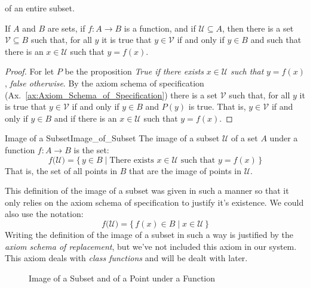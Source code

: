         of an entire subset.
        \begin{theorem}
            If $A$ and $B$ are sets, if $f:A\rightarrow{B}$ is a function,
            and if $\mathcal{U}\subseteq{A}$, then there is a set
            $\mathcal{V}\subseteq{B}$ such that, for all $y$ it is true that
            $y\in\mathcal{V}$ if and only if $y\in{B}$ and such that there is
            an $x\in\mathcal{U}$ such that $y=f(x)$.
        \end{theorem}
        \begin{proof}
            For let $P$ be the proposition \textit{True if there exists}
            $x\in\mathcal{U}$ \textit{such that} $y=f(x)$,
            \textit{false otherwise}. By the axiom schema of specification
            (Ax.~\ref{ax:Axiom_Schema_of_Specification}) there is a set
            $\mathcal{V}$ such that, for all $y$ it is true that
            $y\in\mathcal{V}$ if and only if $y\in{B}$ and $P(y)$ is true. That
            is, $y\in\mathcal{V}$ if and only if $y\in{B}$ and if there is an
            $x\in\mathcal{U}$ such that $y=f(x)$.
        \end{proof}
        \begin{fdefinition}{Image of a Subset}{Image_of_Subset}
            The image of a subset $\mathcal{U}$ of a set $A$ under a function
            $f:A\rightarrow{B}$ is the set:
            \begin{equation}
                f\big(\mathcal{U}\big)=
                    \{\,y\in{B}\;|\;\textrm{There exists }x\in\mathcal{U}
                                    \textrm{ such that }y=f(x)\,\}
            \end{equation}
            That is, the set of all points in $B$ that are the
            image of points in $\mathcal{U}$.
        \end{fdefinition}
        This definition of the image of a subset was given in such a manner
        so that it only relies on the axiom schema of specification to
        justify it's existence. We could also use the notation:
        \begin{equation}
            f\big(\mathcal{U})=\{\,f(x)\in{B}\;|\;x\in\mathcal{U}\,\}
        \end{equation}
        Writing the definition of the image of a subset in such a way is
        justified by the \textit{axiom schema of replacement}, but we've not
        included this axiom in our system. This axiom deals with
        \textit{class functions} and will be dealt with later.
        \begin{figure}[H]
            \centering
            \captionsetup{type=figure}
            
            \caption{Image of a Subset and of a Point under a Function}
            \label{fig:Image_of_Point_and_Subset}
        \end{figure}
